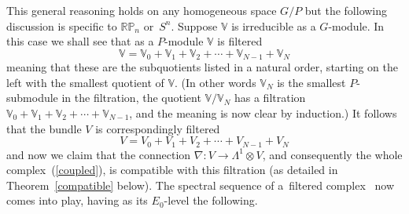 \documentclass[pdftex]{sigma}
\begin{document}
This general reasoning holds on any homogeneous space $G/P$ but the following
discussion is specif\/ic to ${\mathbb{RP}}_n$ or~$S^n$. Suppose ${\mathbb{V}}$ is
irreducible as a $G$-module. In this case we shall see that as a $P$-module
${\mathbb{V}}$ is f\/iltered
\begin{equation}\label{filtration}
{\mathbb{V}}={\mathbb{V}}_0+{\mathbb{V}}_1+{\mathbb{V}}_2+
\cdots+{\mathbb{V}}_{N-1}+{\mathbb{V}}_N\end{equation} meaning that
these are the subquotients listed in a natural order, starting on the
left with the smallest quotient of $\mathbb{V}$.  (In other words
${\mathbb{V}}_N$ is the smallest $P$-submodule in the f\/iltration, the
quotient ${\mathbb{V}}/{\mathbb{V}}_N$ has a f\/iltration
${\mathbb{V}}_0+{\mathbb{V}}_1+{\mathbb{V}}_2+
\cdots+{\mathbb{V}}_{N-1}$, and the meaning is now clear by induction.)
It follows that the bundle $V$ is correspondingly f\/iltered
\begin{equation}\label{correspondingfiltration}
V=V_0+V_1+V_2+\cdots+V_{N-1}+V_N\end{equation}
and now we claim that the connection $\nabla:V\to\Lambda^1\otimes V$, and
consequently the whole complex~(\ref{coupled}), is compatible with this
f\/iltration (as detailed in Theorem~\ref{compatible} below). The spectral
sequence of a~f\/iltered complex~\cite{c} now comes into play, having as its
$E_0$-level the following.
\end{document}

